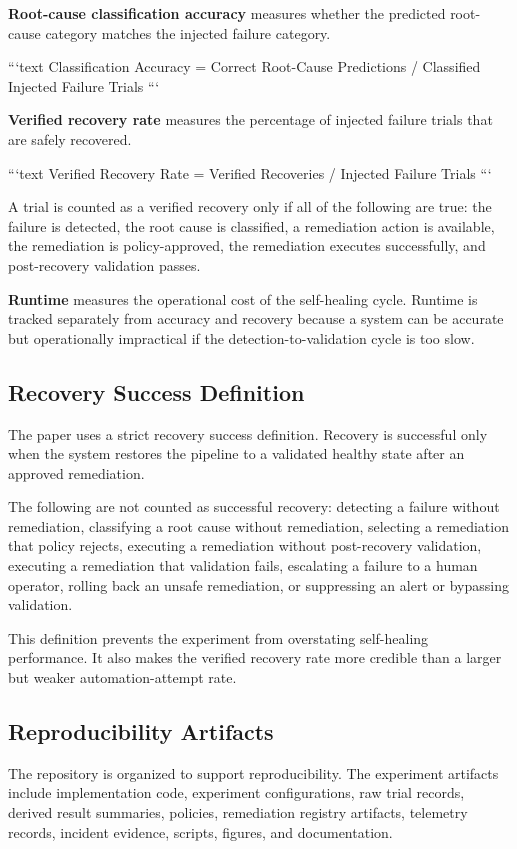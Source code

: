 \textbf{Root-cause classification accuracy} measures whether the predicted root-cause category matches the injected failure category.

```text
Classification Accuracy = Correct Root-Cause Predictions / Classified Injected Failure Trials
```

\textbf{Verified recovery rate} measures the percentage of injected failure trials that are safely recovered.

```text
Verified Recovery Rate = Verified Recoveries / Injected Failure Trials
```

A trial is counted as a verified recovery only if all of the following are true: the failure is detected, the root cause is classified, a remediation action is available, the remediation is policy-approved, the remediation executes successfully, and post-recovery validation passes.

\textbf{Runtime} measures the operational cost of the self-healing cycle. Runtime is tracked separately from accuracy and recovery because a system can be accurate but operationally impractical if the detection-to-validation cycle is too slow.

\subsection{Recovery Success Definition}


The paper uses a strict recovery success definition. Recovery is successful only when the system restores the pipeline to a validated healthy state after an approved remediation.

The following are not counted as successful recovery: detecting a failure without remediation, classifying a root cause without remediation, selecting a remediation that policy rejects, executing a remediation without post-recovery validation, executing a remediation that validation fails, escalating a failure to a human operator, rolling back an unsafe remediation, or suppressing an alert or bypassing validation.

This definition prevents the experiment from overstating self-healing performance. It also makes the verified recovery rate more credible than a larger but weaker automation-attempt rate.

\subsection{Reproducibility Artifacts}


The repository is organized to support reproducibility. The experiment artifacts include implementation code, experiment configurations, raw trial records, derived result summaries, policies, remediation registry artifacts, telemetry records, incident evidence, scripts, figures, and documentation.

